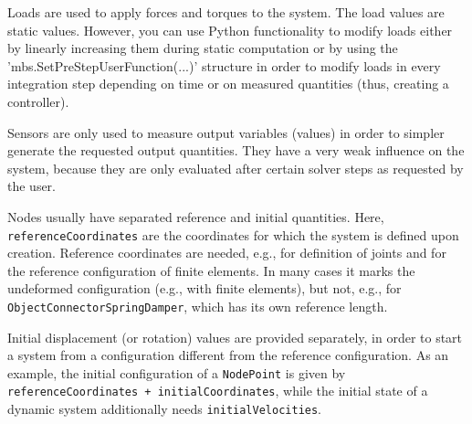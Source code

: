 Loads are used to apply forces and torques to the system. The load values are static values. However, you can use Python functionality to modify loads either by linearly increasing them during static computation or by using the 'mbs.SetPreStepUserFunction(...)' structure in order to modify loads in every integration step depending on time or on measured quantities (thus, creating a controller).

Sensors are only used to measure output variables (values) in order to simpler generate the requested output quantities.
They have a very weak influence on the system, because they are only evaluated after certain solver steps as requested by the user.

Nodes usually have separated reference and initial quantities. Here, 
\texttt{referenceCoordinates} are the coordinates for which the system is defined upon creation. Reference coordinates are needed, e.g., for definition of joints and for the reference configuration of finite elements. In many cases it marks the undeformed configuration (e.g., with finite elements), but not, e.g., for \texttt{ObjectConnectorSpringDamper}, which has its own reference length. 

Initial displacement (or rotation) values are provided separately, in order to start a system from a configuration different from the reference configuration.
As an example, the initial configuration of a \texttt{NodePoint} is given by \texttt{referenceCoordinates + initialCoordinates}, while the initial state of a dynamic system additionally needs \texttt{initialVelocities}.

